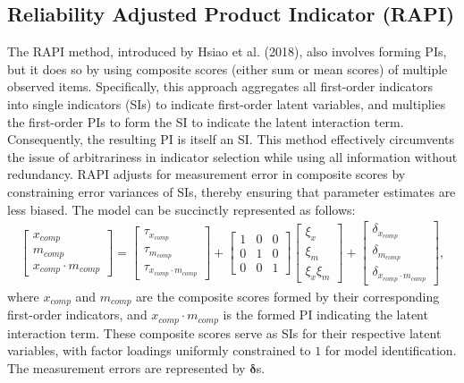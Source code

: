 \documentclass[
  man]{apa6}
\begin{document}
\subsection{Reliability Adjusted Product Indicator (RAPI)}\label{reliability-adjusted-product-indicator-rapi}

The RAPI method, introduced by Hsiao et al. (2018), also involves forming PIs, but it does so by using composite scores (either sum or mean scores) of multiple observed items. Specifically, this approach aggregates all first-order indicators into single indicators (SIs) to indicate first-order latent variables, and multiplies the first-order PIs to form the SI to indicate the latent interaction term. Consequently, the resulting PI is itself an SI. This method effectively circumvents the issue of arbitrariness in indicator selection while using all information without redundancy. RAPI adjusts for measurement error in composite scores by constraining error variances of SIs, thereby ensuring that parameter estimates are less biased. The model can be succinctly represented as follows:
\begin{align}
    \begin{bmatrix}
        x_{comp} \\
        m_{comp} \\
        x_{comp} \cdot m_{comp}
    \end{bmatrix} = 
    \begin{bmatrix}
        \tau_{x_{comp}} \\
        \tau_{m_{comp}} \\ 
        \tau_{x_{comp} \cdot m_{comp}} 
    \end{bmatrix} + 
    \begin{bmatrix}
        1 & 0 & 0 \\
        0 & 1 & 0 \\ 
        0 & 0 & 1 
    \end{bmatrix}
    \begin{bmatrix}
        \xi_{x} \\  
        \xi_{m} \\ 
        \xi_{x}\xi_{m}
    \end{bmatrix} +
    \begin{bmatrix}
        \delta_{x_{comp}} \\
        \delta_{m_{comp}} \\ 
        \delta_{x_{comp} \cdot m_{comp}}
    \end{bmatrix},
\end{align}
where \(x_{comp}\) and \(m_{comp}\) are the composite scores formed by their corresponding first-order indicators, and \(x_{comp} \cdot m_{comp}\) is the formed PI indicating the latent interaction term. These composite scores serve as SIs for their respective latent variables, with factor loadings uniformly constrained to \(1\) for model identification. The measurement errors are represented by \(\mathbf{\delta}\)s.
\end{document}
